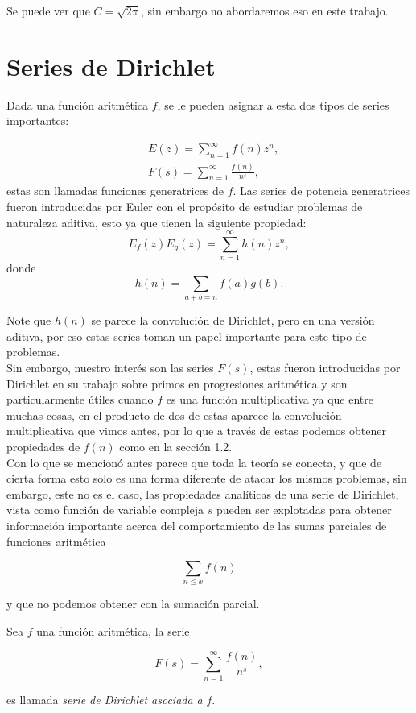 Se puede ver que $C=\sqrt{2\pi}$, sin embargo no abordaremos eso en este trabajo.

\section{Series de Dirichlet}

Dada una función aritmética $f$, se le pueden asignar a esta dos tipos de series importantes:

$$
\begin{aligned}
& E(z)=\sum_{n=1}^{\infty} f(n) z^n, \\
& F(s)=\sum_{n=1}^{\infty} \frac{f(n)}{n^s},
\end{aligned}
$$
estas son llamadas funciones generatrices de $f$.
Las series de potencia generatrices fueron introducidas por Euler con el propósito de estudiar problemas de naturaleza aditiva, esto ya que tienen la siguiente propiedad:\\

$$
E_f(z) E_g(z)=\sum_{n=1}^{\infty} h(n) z^n,
$$
donde
$$
h(n)=\sum_{a+b=n} f(a) g(b) .
$$

Note que $h(n)$ se parece la convolución de Dirichlet, pero en una versión aditiva, por eso estas series toman un papel importante para este tipo de problemas.\\

Sin embargo, nuestro interés son las series $F(s)$, estas fueron introducidas por Dirichlet en su trabajo sobre primos en progresiones aritmética y son particularmente útiles cuando $f$ es una función multiplicativa ya que entre muchas cosas, en el producto de dos de  estas aparece la convolución multiplicativa que vimos antes, por lo que a través de estas podemos obtener propiedades de $f(n)$ como en la sección 1.2.\\

Con lo que se mencionó antes parece que toda la teoría se conecta, y que de cierta forma esto solo es una forma diferente de atacar los mismos problemas, sin embargo, este no es el caso, las propiedades analíticas de una serie de Dirichlet, vista como función de variable compleja $s$ pueden ser explotadas para obtener información importante acerca del comportamiento de las sumas parciales de funciones aritmética

$$\sum_{n\leq x}f(n)$$

y que no podemos obtener con la sumación parcial.
\begin{definition}

Sea $f$ una función aritmética, la serie

$$F(s)=\sum_{n=1}^{\infty}\frac{f(n)}{n^s},$$

es llamada \textit{serie de Dirichlet asociada a} $f$.

\end{definition}

